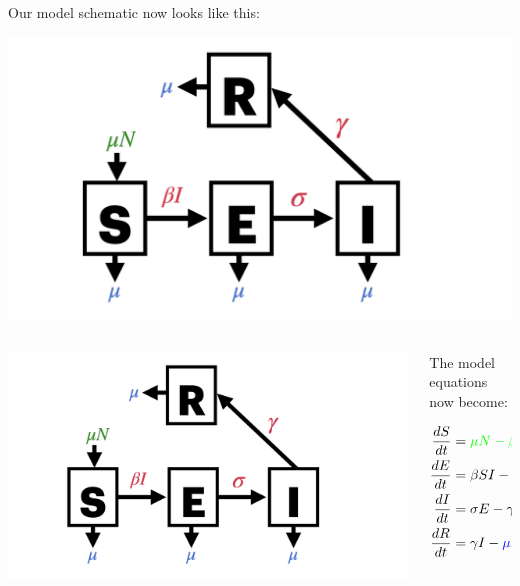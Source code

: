 \documentclass[
  ignorenonframetext,
]{beamer}
\begin{document}
\begin{frame}
Our model schematic now looks like this:

\includegraphics{images/model_diagrams/model_diagrams.009.jpeg}

\end{frame}

\begin{frame}
\begin{columns}[T]
\begin{column}{0.5\textwidth}
\includegraphics{images/model_diagrams/model_diagrams.009.jpeg}
\end{column}

\begin{column}{0.5\textwidth}
The model equations now become:

\begin{align}
\frac{dS}{dt} & = \color{green}{\mu N} - \beta S I - \color{blue}{\mu} S \\
\frac{dE}{dt} & = \beta S I - \sigma E - \color{blue}{\mu} E \\
\frac{dI}{dt} & = \sigma E - \gamma I - \color{blue}{\mu} I \\
\frac{dR}{dt} & = \gamma I - \color{blue}{\mu} R
\end{align}
\end{column}
\end{columns}
\end{frame}
\end{document}
